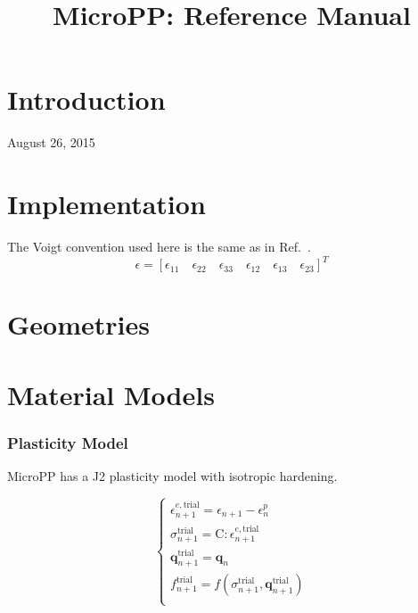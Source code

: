 \documentclass[conference]{IEEEtran}
\begin{document}
\title{MicroPP: Reference Manual}

\author{
}

\maketitle


\IEEEpeerreviewmaketitle

\section{Introduction}

\hfill August 26, 2015

\section{Implementation}

The Voigt convention used here is the same as in Ref.~\cite{simo}.
\begin{equation}
\epsilon = \left[\epsilon_{11} \quad \epsilon_{22} \quad \epsilon_{33} \quad \epsilon_{12} \quad \epsilon_{13} \quad \epsilon_{23} \right]^T
\end{equation}

\section{Geometries}

\section{Material Models}

\subsubsection{Plasticity Model}

MicroPP has a J2 plasticity model with isotropic hardening.

\begin {equation}
\left\{
\begin{array}{ll}
\epsilon_{n+1}^{e,\text{trial}} = \epsilon_{n+1} - \epsilon_{n}^{p} \\[5pt]
\sigma_{n+1}^{\text{trial}} = \mathrm{C} : \epsilon_{n+1}^{e,\text{trial}} \\[5pt]
\mathbf{q}_{n+1}^{\text{trial}} = \mathbf{q}_{n} \\[5pt]
f_{n+1}^{\text{trial}} = f (\sigma_{n+1}^{\text{trial}}, \mathbf{q}_{n+1}^{\text{trial}})\\
\end{array}
\right.
\end {equation}
\end{document}
